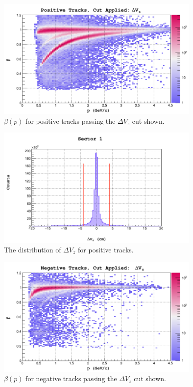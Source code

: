 \begin{figure}
  \begin{center}
    \includegraphics[width=10cm]{image/kp/BetaPDVzCutSector1.png}
    \caption{ $\beta (p)$ for positive tracks passing the $\Delta V_{z}$ cut shown. }
  \end{center}
\end{figure}

\begin{figure}
  \begin{center}
    \includegraphics[width=10cm]{image/kp/kp_dvz_sector1.png}
    \caption{The distribution of $\Delta V_{z}$ for positive tracks.}
  \end{center}
\end{figure}

\begin{figure}
  \begin{center}
    \includegraphics[width=10cm]{image/km/BetaPDVzCutSector1.png}
    \caption{ $\beta (p)$ for negative tracks passing the $\Delta V_{z}$ cut shown. }
  \end{center}
\end{figure}

